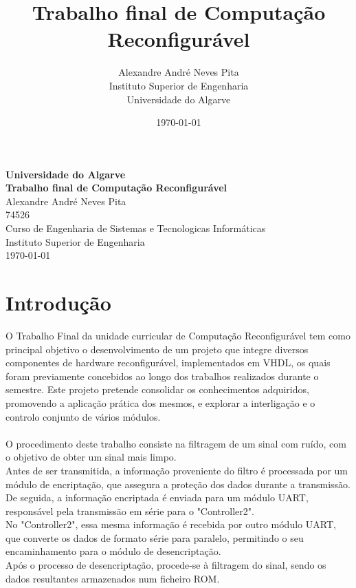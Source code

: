 \documentclass[12pt, a4paper]{article}
\title{Trabalho final de Computação Reconfigurável}
\author{Alexandre André Neves Pita\\
Instituto Superior de Engenharia \\
Universidade do Algarve \\}
\date{\today}
\begin{document}
\begin{titlepage}
    \centering
    \vspace*{2cm}

    {\Large\textbf{Universidade do Algarve}}\\[1.5cm]

    {\Huge\textbf{Trabalho final de Computação Reconfigurável}}\\[2cm]

    {\Large Alexandre André Neves Pita}\\
    74526\\[1.5cm]

    {\large Curso de Engenharia de Sistemas e Tecnologicas Informáticas}\\
    Instituto Superior de Engenharia\\[2cm]

    {\large \today}

    \vfill
\end{titlepage}
\newpage
\tableofcontents
\newpage


\section{Introdução}
O Trabalho Final da unidade curricular de Computação Reconfigurável tem como principal objetivo o desenvolvimento de um projeto que integre diversos componentes de hardware reconfigurável,
 implementados em VHDL, os quais foram previamente concebidos ao longo dos trabalhos realizados durante o semestre.
Este projeto pretende consolidar os conhecimentos adquiridos, promovendo a aplicação prática dos mesmos, e explorar a interligação e o controlo conjunto de vários módulos.\\
\\
O procedimento deste trabalho consiste na filtragem de um sinal com ruído, com o objetivo de obter um sinal mais limpo.\\  
Antes de ser transmitida, a informação proveniente do filtro é processada por um módulo de encriptação, que assegura a proteção dos dados durante a transmissão.\\
De seguida, a informação encriptada é enviada para um módulo UART, responsável pela transmissão em série para o "Controller2".\\
No "Controller2", essa mesma informação é recebida por outro módulo UART, que converte os dados de formato série para paralelo, permitindo o seu encaminhamento para o módulo de desencriptação.\\
Após o processo de desencriptação, procede-se à filtragem do sinal, sendo os dados resultantes armazenados num ficheiro ROM.\\
\end{document}
